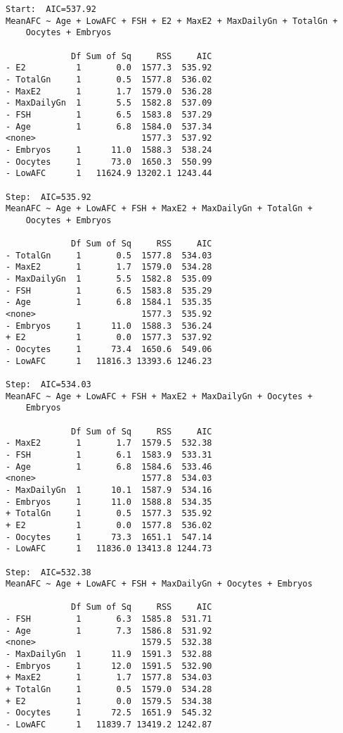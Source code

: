 \documentclass[11pt]{article}
\begin{document}
\begin{enumerate}
\begin{verbatim}
Start:  AIC=537.92
MeanAFC ~ Age + LowAFC + FSH + E2 + MaxE2 + MaxDailyGn + TotalGn + 
    Oocytes + Embryos

             Df Sum of Sq     RSS     AIC
- E2          1       0.0  1577.3  535.92
- TotalGn     1       0.5  1577.8  536.02
- MaxE2       1       1.7  1579.0  536.28
- MaxDailyGn  1       5.5  1582.8  537.09
- FSH         1       6.5  1583.8  537.29
- Age         1       6.8  1584.0  537.34
<none>                     1577.3  537.92
- Embryos     1      11.0  1588.3  538.24
- Oocytes     1      73.0  1650.3  550.99
- LowAFC      1   11624.9 13202.1 1243.44

Step:  AIC=535.92
MeanAFC ~ Age + LowAFC + FSH + MaxE2 + MaxDailyGn + TotalGn + 
    Oocytes + Embryos

             Df Sum of Sq     RSS     AIC
- TotalGn     1       0.5  1577.8  534.03
- MaxE2       1       1.7  1579.0  534.28
- MaxDailyGn  1       5.5  1582.8  535.09
- FSH         1       6.5  1583.8  535.29
- Age         1       6.8  1584.1  535.35
<none>                     1577.3  535.92
- Embryos     1      11.0  1588.3  536.24
+ E2          1       0.0  1577.3  537.92
- Oocytes     1      73.4  1650.6  549.06
- LowAFC      1   11816.3 13393.6 1246.23

Step:  AIC=534.03
MeanAFC ~ Age + LowAFC + FSH + MaxE2 + MaxDailyGn + Oocytes + 
    Embryos

             Df Sum of Sq     RSS     AIC
- MaxE2       1       1.7  1579.5  532.38
- FSH         1       6.1  1583.9  533.31
- Age         1       6.8  1584.6  533.46
<none>                     1577.8  534.03
- MaxDailyGn  1      10.1  1587.9  534.16
- Embryos     1      11.0  1588.8  534.35
+ TotalGn     1       0.5  1577.3  535.92
+ E2          1       0.0  1577.8  536.02
- Oocytes     1      73.3  1651.1  547.14
- LowAFC      1   11836.0 13413.8 1244.73

Step:  AIC=532.38
MeanAFC ~ Age + LowAFC + FSH + MaxDailyGn + Oocytes + Embryos

             Df Sum of Sq     RSS     AIC
- FSH         1       6.3  1585.8  531.71
- Age         1       7.3  1586.8  531.92
<none>                     1579.5  532.38
- MaxDailyGn  1      11.9  1591.3  532.88
- Embryos     1      12.0  1591.5  532.90
+ MaxE2       1       1.7  1577.8  534.03
+ TotalGn     1       0.5  1579.0  534.28
+ E2          1       0.0  1579.5  534.38
- Oocytes     1      72.5  1651.9  545.32
- LowAFC      1   11839.7 13419.2 1242.87


\end{verbatim}
\end{enumerate}
\end{document}
